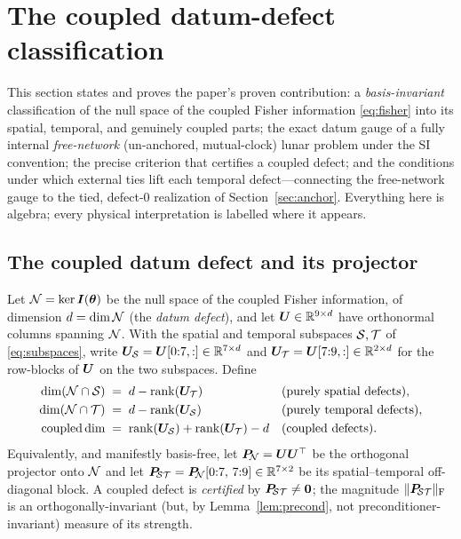\section{The coupled datum-defect classification}
\label{sec:theorem}

This section states and proves the paper's proven contribution: a \emph{basis-invariant}
classification of the null space of the coupled Fisher information \eqref{eq:fisher} into
its spatial, temporal, and genuinely coupled parts; the exact datum gauge of a fully
internal \emph{free-network} (un-anchored, mutual-clock) lunar problem under the SI
convention; the precise criterion that certifies a coupled defect; and the conditions under
which external ties lift each temporal defect---connecting the free-network gauge to the
tied, defect-$0$ realization of Section~\ref{sec:anchor}. Everything here is \Proven{}
algebra; every physical interpretation is labelled where it appears.

\subsection{The coupled datum defect and its projector}
\label{sec:defectdef}

\begin{definition}
\label{def:defect}
Let $\mathcal{N}=\ker\bm{I}(\bm{\theta})$ be the null space of the coupled Fisher information, of
dimension $d=\dim\mathcal{N}$ (the \emph{datum defect}), and let $\bm{U}\in\mathbb{R}^{9\times d}$ have
orthonormal columns spanning $\mathcal{N}$. With the spatial and temporal subspaces
$\mathcal{S},\mathcal{T}$ of \eqref{eq:subspaces}, write $\bm{U}_{\mathcal{S}}=\bm{U}[0{:}7,:]\in\mathbb{R}^{7\times d}$
and $\bm{U}_{\mathcal{T}}=\bm{U}[7{:}9,:]\in\mathbb{R}^{2\times d}$ for the row-blocks of $\bm{U}$ on the two
subspaces. Define
\begin{align}
  \dim(\mathcal{N}\cap\mathcal{S}) &\;=\; d-\operatorname{rank}(\bm{U}_{\mathcal{T}}) &&\text{(purely spatial defects)},
  \label{eq:dimspatial}\\
  \dim(\mathcal{N}\cap\mathcal{T}) &\;=\; d-\operatorname{rank}(\bm{U}_{\mathcal{S}}) &&\text{(purely temporal defects)},
  \label{eq:dimtemporal}\\
  \operatorname{coupled\,dim} &\;=\; \operatorname{rank}(\bm{U}_{\mathcal{S}})+\operatorname{rank}(\bm{U}_{\mathcal{T}})-d
     &&\text{(coupled defects)}.
  \label{eq:coupleddim}
\end{align}
Equivalently, and manifestly basis-free, let $\bm{P}_{\!\mathcal{N}}=\bm{U}\bm{U}^\top$ be the orthogonal
projector onto $\mathcal{N}$ and let $\bm{P}_{\!\mathcal{S}\mathcal{T}}=\bm{P}_{\!\mathcal{N}}[0{:}7,\,7{:}9]\in\mathbb{R}^{7\times2}$ be its
spatial--temporal off-diagonal block. A coupled defect is \emph{certified} by
$\bm{P}_{\!\mathcal{S}\mathcal{T}}\neq\bm0$; the magnitude $\lVert\bm{P}_{\!\mathcal{S}\mathcal{T}}\rVert_{\mathrm F}$ is an orthogonally-invariant
(but, by Lemma~\ref{lem:precond}, not preconditioner-invariant) measure of its strength.
\end{definition}

